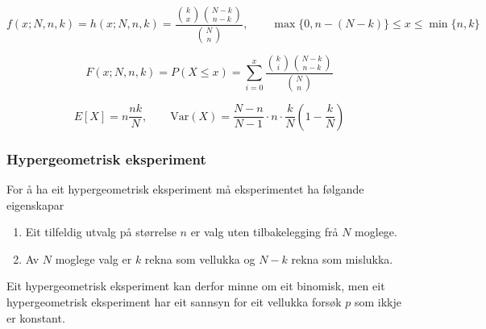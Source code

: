 \begin{equation}
    f(x; N, n, k) = h(x; N, n, k) = \frac{\binom{k}{x}\binom{N-k}{n-k}}{\binom{N}{n}},
    \qquad \max\{0, n - (N - k)\} \leq x \leq \min \{n, k\}
\end{equation}

\begin{equation}
    F(x; N, n, k) = P(X \leq x) = \sum_{i = 0}^{x} \frac{\binom{k}{i}\binom{N-k}{n-k}}{\binom{N}{n}}
\end{equation}

\begin{equation}
    E[X] = n\frac{nk}{N}, \qquad \text{Var}(X) = \frac{N-n}{N-1}\cdot n \cdot \frac{k}{N}\left( 1 - \frac{k}{N}\right)
\end{equation}

\subsubsection{Hypergeometrisk eksperiment}\label{chap:hypergeom}
For å ha eit hypergeometrisk eksperiment må eksperimentet ha følgande eigenskapar

\begin{enumerate}
    \item Eit tilfeldig utvalg på størrelse $n$ er valg uten tilbakelegging frå $N$ moglege.
    \item Av $N$ moglege valg er $k$ rekna som vellukka og $N - k$ rekna som mislukka.
\end{enumerate}

Eit hypergeometrisk eksperiment kan derfor minne om eit binomisk, men eit hypergeometrisk eksperiment har eit sannsyn for eit vellukka forsøk $p$ som ikkje er konstant.


